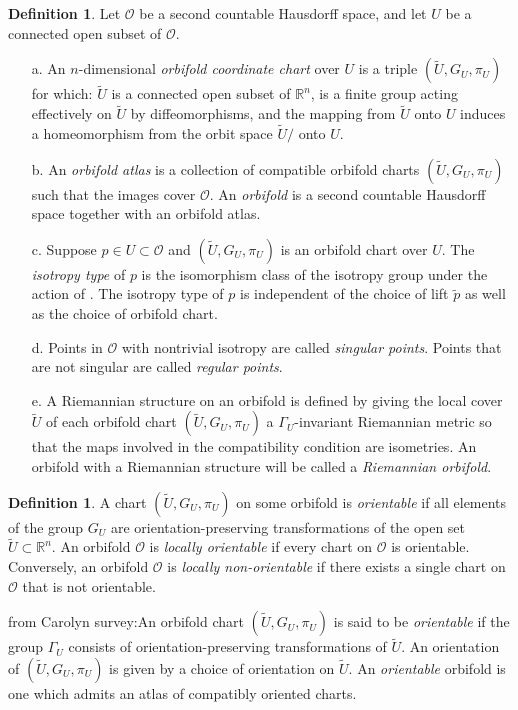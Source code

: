 \documentclass{amsart}
\theoremstyle{plain}
\theoremstyle{definition}
\newtheorem{definition}[thm]{Definition}
\theoremstyle{remark}
\newcommand{\R}{\mathbb{R}}
\newcommand{\wtu}{\widetilde{U}}
\newcommand{\orb}{\mathcal O}
\newcommand{\cc}{(\widetilde{U}, G_U, \pi_U)}
\begin{document}
\begin{definition} \label{defn:ofld}
Let $\orb$ be a second countable Hausdorff space, and let $U$ be a connected open subset of $\orb$.   
 \begin{enumerate}
\item[a.] An $n$-dimensional \emph{orbifold coordinate chart} over $U$ is a
    triple $\cc$ for which: $\wtu$ is a connected open subset of $\R^n$,
     is a finite group acting effectively on
    $\wtu$ by diffeomorphisms, and the mapping 
    from $\wtu$ onto $U$\add{$\in \orb$} induces a homeomorphism from the orbit space
    $\wtu/$ onto $U$.
\item [b.] An \emph{orbifold atlas} is a collection of compatible orbifold
    charts $\cc$ such that the images \rep{$\varphi_U({\wtu})$}{$\pi_U$} cover $\orb$.  An \emph{orbifold} is a second countable Hausdorff space together with an orbifold atlas.  
\item[c.] Suppose $p\in U\subset \orb$ and $\cc$ is an orbifold chart over
    $U$.  The \emph{isotropy type} of $p$ is the isomorphism class of the
isotropy group \rep{a lift of $p$ of a lift $\tilde p$ of $p$ in $\wtu$}{of
    $\tilde{p} \in \widetilde{U}$, a lift of $p$} under the action of
    .  The isotropy type of $p$ is independent of the choice of lift $\tilde p$ as well as the choice of orbifold chart.  
\item[d.] Points in $\orb$ with nontrivial isotropy are called \emph{singular points}.  Points that are not singular are called \emph{regular points}. 
\item[e.] A Riemannian structure on an orbifold is defined by giving the local cover $\wtu$ of each orbifold chart $\cc$ a $\Gamma_U$-invariant Riemannian metric so that the maps involved in the compatibility condition are isometries.  An orbifold with a Riemannian structure will be called a \emph{Riemannian orbifold}.  
\end{enumerate}
\end{definition}

\begin{definition}
    A chart $(\tilde{U},G_U,\pi_U)$ on some orbifold is \emph{orientable} if all elements of the group $G_U$ are orientation-preserving transformations of the open set $\tilde{U} \subset \mathbb{R}^n$. An orbifold $\mathcal{O}$ is \emph{locally orientable} if every chart on $\mathcal{O}$ is orientable. Conversely, an orbifold $\mathcal{O}$ is \emph{locally non-orientable} if there exists a single chart on $\mathcal{O}$ that is not orientable.
    
    from Carolyn survey:An orbifold chart $\cc$ is said to be \emph{orientable} if the group $\Gamma_U$ consists of orientation-preserving transformations of $\wtu$.  An orientation of $\cc$ is given by a choice of orientation on $\wtu$. An \emph{orientable} orbifold is one which admits an atlas of compatibly oriented charts.
\end{definition}
\end{document}
